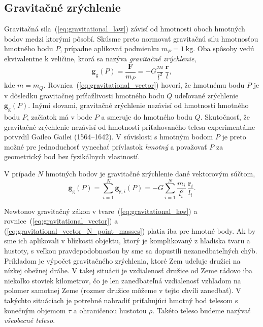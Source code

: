 \documentclass[a4paper, 12pt]{book}
\newcommand{\gidx}{\mathrm g}
\let\vec\mathbf
\begin{document}
\subsection{Gravitačné zrýchlenie}

Gravitačná sila~(\ref{eq:gravitational_law}) závisí od hmotnosti oboch hmotných 
bodov medzi ktorými pôsobí.  Skúsme preto normovať gravitačnú silu hmotnosťou 
hmotného bodu $P$, prípadne aplikovať podmienku $m_P = 1\ \mathrm{kg}$.  Oba 
spôsoby vedú ekvivalentne k veličine, ktorá sa nazýva \emph{gravitačné 
zrýchlenie},
%
\begin{equation}
\label{eq:gravitational_vector}
\vec g_\gidx(P) = \frac{\vec F}{m_P} = -G \frac{m}{l^2} \, \frac{\vec r}{l}{,}
\end{equation}
%
kde $m = m_Q$.  Rovnica~(\ref{eq:gravitational_vector}) hovorí, že hmotnému 
bodu $P$ je v dôsledku gravitačnej príťažlivosti hmotného bodu $Q$ udeľované 
zrýchlenie $\vec g_\gidx(P)$.   Inými slovami, gravitačné zrýchlenie nezávisí 
od hmotnosti hmotného bodu $P$, začiatok má v bode $P$ a smeruje do hmotného 
bodu $Q$.  Skutočnosť, že gravitačné zrýchlenie nezávisí od hmotnosti 
priťahovaného telesa experimentálne potvrdil Gaileo Gailei (1564--1642).  
V súvislosti s hmotným bodom $P$ je preto možné pre jednoduchosť vynechať 
prívlastok \emph{hmotný} a považovať $P$ za geometrický bod bez fyzikálnych 
vlastností.

V prípade $N$ hmotných bodov je gravitačné zrýchlenie dané vektorovým súčtom,
%
\begin{equation}
\label{eq:gravitational_vector_N_point_masses}
\vec g_\gidx(P) = \sum_{i = 1}^{N}\vec g_{\gidx,i}(P) = -G \sum_{i = 1}^{N} 
\frac{m_i}{l_i^2} \, \frac{\vec r_i}{l_i}{.}
\end{equation}

Newtonov gravitačný zákon v tvare~(\ref{eq:gravitational_law}) 
a rovnice~(\ref{eq:gravitational_vector}) 
a (\ref{eq:gravitational_vector_N_point_masses}) platia iba pre hmotné body.  
Ak by sme ich aplikovali v blízkosti objektu, ktorý je komplikovaný z hľadiska 
tvaru a hustoty, s veľkou pravdepodobnosťou by sme sa dopustili 
nezanedbateľných chýb.  Príkladom je výpočet gravitačného zrýchlenia, ktoré Zem 
udeľuje družici na nízkej obežnej dráhe.  V takej situácii je vzdialenosť 
družice od Zeme rádovo iba niekoľko stoviek kilometrov, čo je len zanedbateľná 
vzdialenosť vzhľadom na polomer samotnej Zeme (rozmer družice môžeme v tejto 
chvíli zanedbať).  V takýchto situáciach je potrebné nahradiť priťahujúci 
hmotný bod telesom s konečným objemom $\tau$ a ohraničenou hustotou $\rho$.  
Takéto teleso budeme nazývať \emph{všeobecné teleso}.
\end{document}
